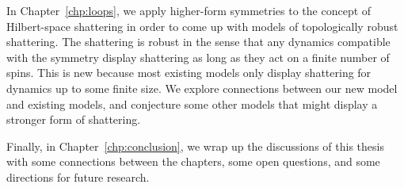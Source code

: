 In Chapter~\ref{chp:loops}, we apply higher-form symmetries to the concept of Hilbert-space shattering in order to come up with models of topologically robust shattering. The shattering is robust in the sense that any dynamics compatible with the symmetry display shattering as long as they act on a finite number of spins. This is new because most existing models only display shattering for dynamics up to some finite size. We explore connections between our new model and existing models, and conjecture some other models that might display a stronger form of shattering.

Finally, in Chapter~\ref{chp:conclusion}, we wrap up the discussions of this thesis with some connections between the chapters, some open questions, and some directions for future research.